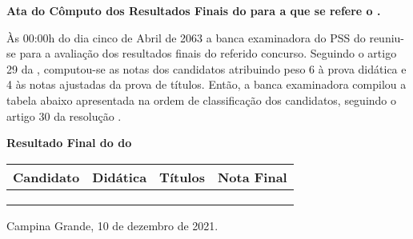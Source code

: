 \documentclass[12pt]{uaefata}
\begin{document}
\begin{letter}{
		\textbf{Ata do Cômputo dos Resultados Finais do \concurso para \cargo  a que se refere o \edital.}
	}
 
\opening{}

Às 00:00h do dia cinco de Abril de 2063 a banca examinadora do PSS do \edital reuniu-se para a avaliação dos resultados finais do referido concurso. Seguindo o artigo 29 da \resconc, computou-se as notas dos candidatos atribuindo peso 6 à prova didática e 4 às notas ajustadas da prova de títulos. Então, a banca examinadora compilou a tabela abaixo apresentada na ordem de classificação dos candidatos, seguindo  o artigo 30 da resolução \resconc. 


\newpage


\centering


\textbf{Resultado Final do \concurso do \edital}

\begin{tabular}{|l|c|c|c|}
	\hline
	\textbf{Candidato}	&	\textbf{Didática}	&	\textbf{Títulos}	&	\textbf{Nota Final}	\\
	\hline
	\cdta	&	\cdtand 	&	\cdtant	&	\cdtanf  	\\
	\cdtb	&	\cdtbnd 	&	\cdtbnt	&	\cdtbnf 	\\
	\cdtc	&	\cdtcnd 	&	\cdtcnt	& 	\cdtcnf 	\\
	\hline
\end{tabular}

\closing{Campina Grande, 10 de dezembro de 2021.}



\end{letter}
\end{document}

